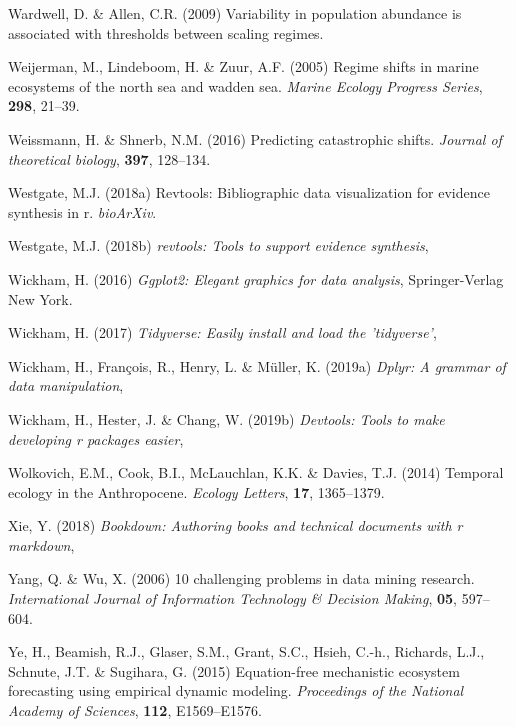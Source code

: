 \documentclass[print]{nuthesis}
\begin{document}
\leavevmode\hypertarget{ref-wardwell2009variability}{}%
Wardwell, D. \& Allen, C.R. (2009) Variability in population abundance is associated with thresholds between scaling regimes.

\leavevmode\hypertarget{ref-weijerman2005regime}{}%
Weijerman, M., Lindeboom, H. \& Zuur, A.F. (2005) Regime shifts in marine ecosystems of the north sea and wadden sea. \emph{Marine Ecology Progress Series}, \textbf{298}, 21--39.

\leavevmode\hypertarget{ref-weissmann2016predicting}{}%
Weissmann, H. \& Shnerb, N.M. (2016) Predicting catastrophic shifts. \emph{Journal of theoretical biology}, \textbf{397}, 128--134.

\leavevmode\hypertarget{ref-revtools2}{}%
Westgate, M.J. (2018a) Revtools: Bibliographic data visualization for evidence synthesis in r. \emph{bioArXiv}.

\leavevmode\hypertarget{ref-revtools}{}%
Westgate, M.J. (2018b) \emph{revtools: Tools to support evidence synthesis},

\leavevmode\hypertarget{ref-ggplot2}{}%
Wickham, H. (2016) \emph{Ggplot2: Elegant graphics for data analysis}, Springer-Verlag New York.

\leavevmode\hypertarget{ref-tidyverse}{}%
Wickham, H. (2017) \emph{Tidyverse: Easily install and load the 'tidyverse'},

\leavevmode\hypertarget{ref-dplyr}{}%
Wickham, H., François, R., Henry, L. \& Müller, K. (2019a) \emph{Dplyr: A grammar of data manipulation},

\leavevmode\hypertarget{ref-devtools}{}%
Wickham, H., Hester, J. \& Chang, W. (2019b) \emph{Devtools: Tools to make developing r packages easier},

\leavevmode\hypertarget{ref-wolkovich_temporal_2014}{}%
Wolkovich, E.M., Cook, B.I., McLauchlan, K.K. \& Davies, T.J. (2014) Temporal ecology in the Anthropocene. \emph{Ecology Letters}, \textbf{17}, 1365--1379.

\leavevmode\hypertarget{ref-bookdown}{}%
Xie, Y. (2018) \emph{Bookdown: Authoring books and technical documents with r markdown},

\leavevmode\hypertarget{ref-yang_10_2006}{}%
Yang, Q. \& Wu, X. (2006) 10 challenging problems in data mining research. \emph{International Journal of Information Technology \& Decision Making}, \textbf{05}, 597--604.

\leavevmode\hypertarget{ref-ye2015equation}{}%
Ye, H., Beamish, R.J., Glaser, S.M., Grant, S.C., Hsieh, C.-h., Richards, L.J., Schnute, J.T. \& Sugihara, G. (2015) Equation-free mechanistic ecosystem forecasting using empirical dynamic modeling. \emph{Proceedings of the National Academy of Sciences}, \textbf{112}, E1569--E1576.
\end{document}
